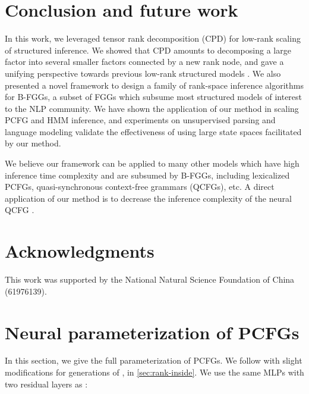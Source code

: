 \documentclass[11pt]{article}
\begin{document}
\section{Conclusion and future work}
In this work, we leveraged tensor rank decomposition (CPD) for low-rank scaling of structured inference. We showed that CPD amounts to decomposing a large factor into several smaller factors connected by a new rank node, and gave a unifying perspective towards previous low-rank structured models \cite{yang-etal-2021-pcfgs, chiu2021low}.  We also presented a novel framework to design a family of rank-space inference algorithms for B-FGGs, a subset of FGGs which subsume most structured models of interest to the NLP community. We have shown the application of our method in scaling PCFG and HMM inference, and experiments on unsupervised parsing and language modeling validate the effectiveness of using large state spaces facilitated by our method. 

We believe our framework can be applied to many other models which have high inference time complexity and are subsumed by B-FGGs, including lexicalized PCFGs, quasi-synchronous context-free grammars (QCFGs), etc. A direct application of our method is to decrease the   inference complexity of the neural QCFG \cite{kim2021sequence}. 


\section*{Acknowledgments}
This work was supported by the National Natural Science Foundation of China (61976139).













\appendix






\section{Neural parameterization of PCFGs}
\label{appd:pcfg}
In this section, we give the full parameterization of PCFGs. We follow \citet{yang-etal-2021-pcfgs} with slight modifications for generations of ,  in \ref{sec:rank-inside}. We use the same MLPs with two residual layers as \citet{yang-etal-2021-pcfgs}:
\end{document}
